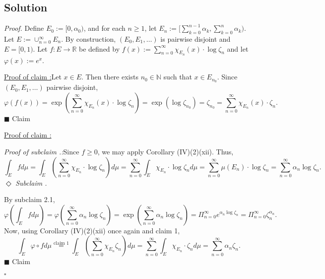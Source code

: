 \documentclass[12pt]{article}
\newcounter{ProofCounter}
\newcounter{ClaimCounter}[ProofCounter]
\newcounter{SubClaimCounter}[ClaimCounter]
\newenvironment{Proof}{\stepcounter{ProofCounter}\textit{Proof.}}{\hfill$\square$}
\newenvironment{claim}[1]{\vspace{3mm}\stepcounter{ClaimCounter}\par\noindent\underline{\bf Claim \theClaimCounter:}\space#1}{}
\newenvironment{claimproof}[1]{\par\noindent\underline{Proof of claim \theClaimCounter:}\space#1}{\hfill $\blacksquare$ Claim \theClaimCounter}
\newenvironment{subclaim}[1]{\stepcounter{SubClaimCounter}\par\noindent\emph{Subclaim \theClaimCounter.\theSubClaimCounter:}\space#1}{}
\newenvironment{subclaimproof}[1]{\par\noindent\emph{Proof of subclaim \theClaimCounter.\theSubClaimCounter:}\space#1}{\hfill
$\Diamond$ \emph{Subclaim \theClaimCounter.\theSubClaimCounter}}
\begin{document}
\subsection*{Solution}
\begin{Proof}
Define $E_{0} := [0, \alpha_{0})$, and for each $n \geq 1$, let $E_{n} := \big[ \sum_{k=0}^{n-1}\alpha_{k}, \sum_{k=0}^{n}\alpha_{k}\big)$. Let $E :=
\cup_{n=0}^{\infty}E_{n}$. By construction, $(E_{0}, E_{1}, \hdots)$ is pairwise disjoint and $E = [0,1)$. Let $f : E \rightarrow \mathbb{R}$ be
defined by $f(x) := \sum_{n=0}^{\infty}\chi_{E_{n}}(x)\cdot \log\zeta_{n}$ and let $\varphi(x) := e^{x}$.

\begin{claimproof}
Let $x \in E$. Then there exists $n_{0} \in \mathbb{N}$ such that $x \in E_{n_{0}}$. Since $(E_{0}, E_{1}, \hdots)$ pairwise disjoint, 
\[ \varphi(f(x)) = \exp\left( \sum_{n=0}^{\infty}\chi_{E_{n}}(x)\cdot \log\zeta_{n} \right) = \exp\left( \log\zeta_{n_{0}} \right) = \zeta_{n_{0}} = 
\sum_{n=0}^{\infty}\chi_{E_{n}}(x)\cdot \zeta_{n}. \]
\end{claimproof}

\begin{claimproof}
\begin{subclaimproof}
Since $f \geq 0$, we may apply Corollary (IV)(2)(xii). Thus, 
\[ \int_{E}fd\mu = \int_{E}\left( \sum_{n=0}^{\infty}\chi_{E_{n}}\cdot \log\zeta_{n} \right)d\mu = \sum_{n=0}^{\infty}\int_{E}\chi_{E_{n}}\cdot
\log\zeta_{n}d\mu = \sum_{n=0}^{\infty}\mu(E_{n})\cdot \log\zeta_{n} = \sum_{n=0}^{\infty}\alpha_{n}\log\zeta_{n}. \]
\end{subclaimproof}

By subclaim 2.1,
\[ \varphi\left( \int_{E}fd\mu \right) = \varphi\left( \sum_{n=0}^{\infty}\alpha_{n}\log\zeta_{n} \right) = \exp\left( \sum_{n=0}^{\infty}\alpha_{n}\log\zeta_{n} \right)
= \Pi_{n=0}^{\infty}e^{\alpha_{n}\log\zeta_{n}} = \Pi_{n=0}^{\infty}\zeta_{n}^{\alpha_{n}}. \]
Now, using Corollary (IV)(2)(xii) once again and claim 1,
\[ \int_{E}\varphi\circ fd\mu \stackrel{\text{claim 1}}{=} \int_{E}\left(\sum_{n=0}^{\infty}\chi_{E_{n}}\zeta_{n}\right)d\mu 
= \sum_{n=0}^{\infty}\int_{E}\chi_{E_{n}}\cdot \zeta_{n}d\mu = \sum_{n=0}^{\infty}\alpha_{n}\zeta_{n}. \]
\end{claimproof}


\end{Proof}
\end{document}

